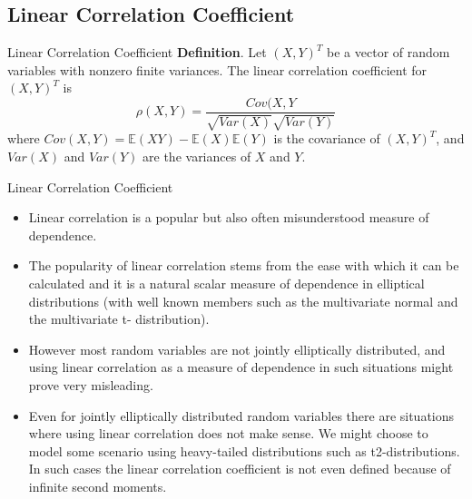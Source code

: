 \documentclass[11pt]{beamer}
\theoremstyle{plain}
\theoremstyle{definition}
\theoremstyle{remark}
\begin{document}
\subsection{Linear Correlation Coefficient}
%
\begin{frame}{Linear Correlation Coefficient}
		\textbf{Definition}. Let $(X,Y)^T$ be a vector of random variables with nonzero finite variances. The linear correlation coefficient 
		for $(X,Y)^T$ is
		\begin{equation}
			\rho(X,Y) = \frac{Cov(X,Y}{\sqrt{Var(X)}\sqrt{Var(Y)}}
		\end{equation}	
		where $Cov(X,Y) = \mathbb{E}(XY) -\mathbb{E}(X)\mathbb{E}(Y)$ is the covariance of $(X,Y)^T$, and $Var(X)$ and
		$Var(Y)$ are the variances of $X$ and $Y$. %
\end{frame}
%
\begin{frame}{Linear Correlation Coefficient}
   \begin{itemize}
      \item  Linear correlation is a popular but also often misunderstood measure of dependence. 
      \item The popularity of linear correlation stems from the ease with which it can be calculated and it is a natural scalar measure of 
      dependence in elliptical distributions (with well known members such as the multivariate normal and the multivariate t-
      distribution). 
      \item However most random variables are not jointly elliptically distributed, and using linear correlation as a measure of 
      dependence in such situations might prove very misleading. 
      \item Even for jointly elliptically distributed random variables there are 
      situations where using linear correlation does not make sense. We might choose to model some scenario using heavy-tailed 
      distributions such as t2-distributions. In such cases the linear correlation coefficient is not even defined because of infinite second 
      moments.
   \end{itemize}
\end{frame}
%
\end{document}
